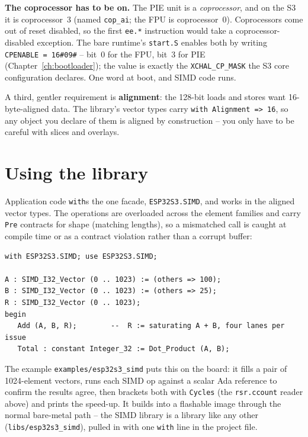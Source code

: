 \textbf{The coprocessor has to be on.} The PIE unit is a \emph{coprocessor}, and on
the S3 it is coprocessor~3 (named \texttt{cop\_ai}; the FPU is coprocessor~0).
Coprocessors come out of reset disabled, so the first \texttt{ee.*} instruction
would take a coprocessor-disabled exception. The bare runtime's \texttt{start.S}
enables both by writing \texttt{CPENABLE = 16\#09\#} -- bit~0 for the FPU, bit~3 for
PIE (Chapter~\ref{ch:bootloader}); the value is exactly the \texttt{XCHAL\_CP\_MASK}
the S3 core configuration declares. One word at boot, and SIMD code runs.

A third, gentler requirement is \textbf{alignment}: the 128-bit loads and stores
want 16-byte-aligned data. The library's vector types carry
\texttt{with Alignment =>\ 16}, so any object you declare of them is aligned by
construction -- you only have to be careful with slices and overlays.

\section{Using the library}

Application code \texttt{with}s the one facade, \texttt{ESP32S3.SIMD}, and works in
the aligned vector types. The operations are overloaded across the element families
and carry \texttt{Pre} contracts for shape (matching lengths), so a mismatched call
is caught at compile time or as a contract violation rather than a corrupt buffer:

\begin{lstlisting}
with ESP32S3.SIMD; use ESP32S3.SIMD;

A : SIMD_I32_Vector (0 .. 1023) := (others => 100);
B : SIMD_I32_Vector (0 .. 1023) := (others => 25);
R : SIMD_I32_Vector (0 .. 1023);
begin
   Add (A, B, R);        --  R := saturating A + B, four lanes per issue
   Total : constant Integer_32 := Dot_Product (A, B);
\end{lstlisting}

The example \texttt{examples/esp32s3\_simd} puts this on the board: it fills a pair of
1024-element vectors, runs each SIMD op against a scalar Ada reference to confirm the
results agree, then brackets both with \texttt{Cycles} (the \texttt{rsr.ccount} reader
above) and prints the speed-up. It builds into a flashable image through the normal
bare-metal path -- the SIMD library is a library like any other
(\texttt{libs/esp32s3\_simd}), pulled in with one \texttt{with} line in the project
file.

